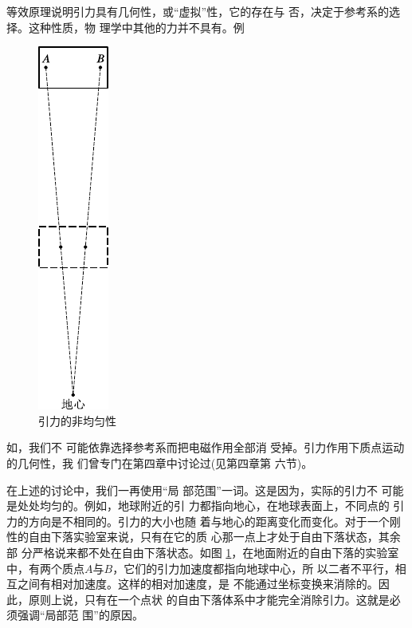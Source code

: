 等效原理说明引力具有几何性，或“虚拟”性，它的存在与
否，决定于参考系的选择。这种性质，物
理学中其他的力并不具有。例
\begin{figure}
  \centering
  \includegraphics{figure/fig12.13}
  \caption{引力的非均匀性}
  \label{fig:12.13}
\end{figure}
如，我们不
可能依靠选择参考系而把电磁作用全部消
受掉。引力作用下质点运动的几何性，我
们曾专门在第四章中讨论过(见第四章第
六节)。


在上述的讨论中，我们一再使用“局
部范围”一词。这是因为，实际的引力不
可能是处处均匀的。例如，地球附近的引
力都指向地心，在地球表面上，不同点的
引力的方向是不相同的。引力的大小也随
着与地心的距离变化而变化。对于一个刚
性的自由下落实验室来说，只有在它的质
心那一点上才处于自由下落状态，其余部
分严格说来都不处在自由下落状态。如图
\ref{fig:12.13}，在地面附近的自由下落的实验室
中，有两个质点$ A $与$ B $，它们的引力加速度都指向地球中心，所
以二者不平行，相互之间有相对加速度。这样的相对加速度，是
不能通过坐标变换来消除的。因此，原则上说，只有在一个点状
的自由下落体系中才能完全消除引力。这就是必须强调“局部范
围”的原因。
